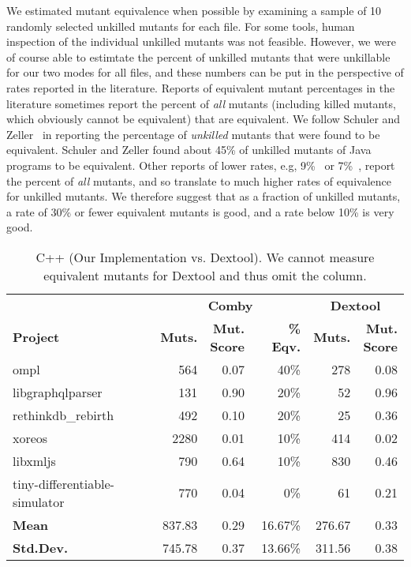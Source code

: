 \documentclass[sigconf,review, anonymous]{acmart}
\begin{document}
{We estimated mutant equivalence when possible by examining a sample of
10 randomly selected unkilled mutants for each file.  For some tools,
human inspection of the individual unkilled mutants was not feasible.
However, we were of course able to estimtate the percent of unkilled
mutants that were unkillable for our two modes for all files, and
these numbers can be put in the perspective of rates reported in the
literature.  Reports of equivalent mutant percentages in the
literature sometimes report the percent of \emph{all} mutants
(including killed mutants, which obviously cannot be equivalent) that
are equivalent.  We follow Schuler and Zeller~\cite{EquivMut} in
reporting the percentage of \emph{unkilled} mutants that were found to
be equivalent.  Schuler and Zeller found about 45\% of unkilled
mutants of Java programs to be equivalent.  Other reports of lower
rates, e.g, 9\%~\cite{offutt1997automatically} or 7\%~\cite{TCE}, report the percent of
\emph{all} mutants, and so translate to much higher rates of
equivalence for unkilled mutants.  We therefore suggest that as a
fraction of unkilled mutants, a rate of 30\% or fewer equivalent
mutants is good, and a rate below 10\% is very good.

\begin{table}[htbp]
\centering
{\small
\caption{C++ (Our Implementation vs. Dextool). We cannot measure equivalent mutants for Dextool and thus omit the column.}
\label{tab:table_cpp2}
\begin{tabularx}{\columnwidth}{X|rrr|rr}
\toprule
        & \multicolumn{3}{c|}{\textbf{Comby}}  & \multicolumn{2}{c}{\textbf{Dextool}} \\ 
\textbf{Project} & \textbf{Muts.} & \makecell{\textbf{Mut.} \\ \textbf{Score}} & \textbf{\% Eqv.} & \textbf{Muts.} & \makecell{\textbf{Mut.} \\ \textbf{Score}} \\[1ex]\midrule
 ompl &  564 & 0.07 & 40\% & 278 & 0.08  \\
 libgraphqlparser  &  131 & 0.90 & 20\% & 52 & 0.96  \\
 rethinkdb\_rebirth &  492 & 0.10 & 20\% & 25 & 0.36 \\
 xoreos &  2280 & 0.01 & 10\% & 414 & 0.02  \\
 libxmljs &  790 & 0.64 & 10\% & 830 & 0.46 \\[0.5ex]
 tiny-differentiable-simulator &  770 & 0.04 & 0\% & 61 & 0.21  \\\midrule
\textbf{Mean}   & 837.83 & 0.29 & 16.67\% & 276.67 & 0.33\\
\textbf{Std.Dev.} & 745.78 & 0.37 & 13.66\%   & 311.56 & 0.38 \\\bottomrule
\end{tabularx}}
\end{table}





}
\end{document}
